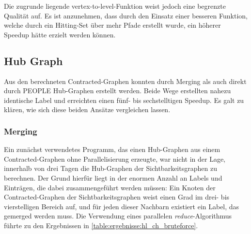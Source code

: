 Die zugrunde liegende vertex-to-level-Funktion weist jedoch eine begrenzte Qualität auf.
Es ist anzunehmen, dass durch den Einsatz einer besseren Funktion, welche durch ein Hitting-Set über mehr Pfade erstellt wurde, ein höherer Speedup hätte erzielt werden können.

\subsection{Hub Graph}

Aus den berechneten Contracted-Graphen konnten durch Merging als auch direkt durch PEOPLE Hub-Graphen erstellt werden.
Beide Wege erstellten nahezu identische Label und erreichten einen fünf- bis sechstelltigen Speedup.
Es galt zu klären, wie sich diese beiden Ansätze vergleichen lassen.

\subsubsection{Merging}

Ein zunächst verwendetes Programm, das einen Hub-Graphen aus einem Contracted-Graphen ohne Parallelisierung erzeugte, war nicht in der Lage, innerhalb von drei Tagen die Hub-Graphen der Sichtbarkeitsgraphen zu berechnen.
Der Grund hierfür liegt in der enormen Anzahl an Labels und Einträgen, die dabei zusammengeführt werden müssen: Ein Knoten der Contracted-Graphen der Sichtbarkeitsgraphen weist einen Grad im drei- bis vierstelligen Bereich auf, und für jeden dieser Nachbarn existiert ein Label, das gemerged werden muss.
Die Verwendung eines parallelen \emph{reduce}-Algorithmus führte zu den Ergebnissen in \autoref{table:ergebnisse:hl_ch_bruteforce}.

